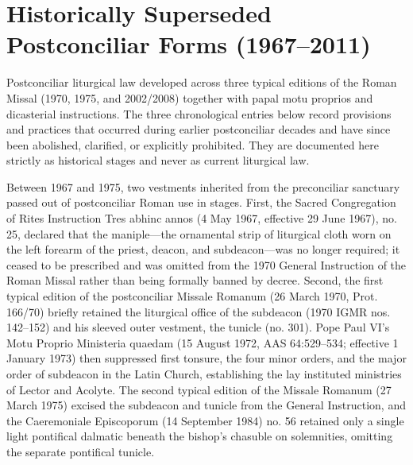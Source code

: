 \clearpage
\section{Historically Superseded Postconciliar Forms (1967--2011)}
Postconciliar liturgical law developed across three typical editions of the Roman Missal (1970, 1975, and 2002/2008) together with papal motu proprios and dicasterial instructions. The three chronological entries below record provisions and practices that occurred during earlier postconciliar decades and have since been abolished, clarified, or explicitly prohibited. They are documented here strictly as historical stages and never as current liturgical law.

\label{pc-obj-hist-subdeacon-tunicle-maniple}
Between 1967 and 1975, two vestments inherited from the preconciliar sanctuary passed out of postconciliar Roman use in stages. First, the Sacred Congregation of Rites Instruction Tres abhinc annos (4 May 1967, effective 29 June 1967), no. 25, declared that the maniple---the ornamental strip of liturgical cloth worn on the left forearm of the priest, deacon, and subdeacon---was no longer required; it ceased to be prescribed and was omitted from the 1970 General Instruction of the Roman Missal rather than being formally banned by decree. Second, the first typical edition of the postconciliar Missale Romanum (26 March 1970, Prot. 166/70) briefly retained the liturgical office of the subdeacon (1970 IGMR nos. 142--152) and his sleeved outer vestment, the tunicle (no. 301). Pope Paul VI's Motu Proprio Ministeria quaedam (15 August 1972, AAS 64:529--534; effective 1 January 1973) then suppressed first tonsure, the four minor orders, and the major order of subdeacon in the Latin Church, establishing the lay instituted ministries of Lector and Acolyte. The second typical edition of the Missale Romanum (27 March 1975) excised the subdeacon and tunicle from the General Instruction, and the Caeremoniale Episcoporum (14 September 1984) no. 56 retained only a single light pontifical dalmatic beneath the bishop's chasuble on solemnities, omitting the separate pontifical tunicle.

